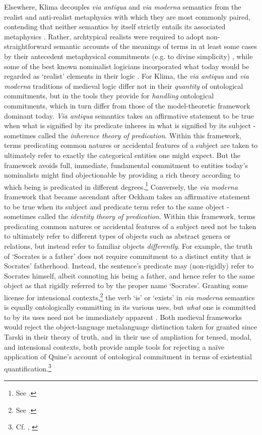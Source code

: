 \documentclass[]{article}
\begin{document}
Elsewhere, Klima decouples \emph{via antiqua} and \emph{via moderna} semantics 
from the realist and anti-realist metaphysics with which they are most commonly paired,
contending that neither semantics by itself strictly entails its associated metaphysics \autocite{Klima1999,Klima2011}. 
Rather, archtypical realists were required to adopt non-straightforward semantic accounts of the meanings of terms in at least some cases by their antecedent metaphysical commitments (e.g. to divine simplicity) \autocite{Klima2002b},
while some of the best known nominalist logicians incorporated what today would be regarded as `realist' elements in their logic \autocite{Klima2005}. 
For Klima, the \emph{via antiqua} and \emph{via moderna} traditions of medieval logic 
differ not in their \emph{quantity} of ontological commitments, 
but in the tools they provide for \emph{handling} ontological commitments, 
which in turn differ from those of the model-theoretic framework dominant today. 
\emph{Via antiqua} semantics takes an affirmative statement to be true when what is signified by its predicate inheres in what is signified by its subject - 
sometimes called the \emph{inherence theory of predication}. 
Within this framework, 
terms predicating common natures or accidental features of a subject are taken to ultimately refer to exactly the categorical entities one might expect. 
But the framework 
avoids full, immediate, fundamental commitment to entities today's nominalists might find objectionable by providing a rich theory according to which being is predicated in different degrees.\footnote{See \autocite{Klima2002}.}
Conversely, the \emph{via moderna} framework that became ascendant after Ockham 
takes an affirmative statement to be true when its subject and predicate term refer to the same object 
 - sometimes called the \emph{identity theory of predication}. 
Within this framework, 
terms predicating common natures or accidental features of a subject need not be taken to ultimately refer to different types of objects such as abstract genera or relations, 
but instead refer to familiar objects \emph{differently}. 
For example, the truth of `Socrates is a father' does not require commitment to a distinct entity that is Socrates' fatherhood.
Instead, the sentence's predicate may (non-rigidly) refer to Socrates himself, 
albeit connoting his being a father, 
and hence refer to the same object as that rigidly referred to by the proper name `Socrates'. 
Granting some license for intensional contexts,\footnote{See \autocite{Klima2005}.} 
the verb `is' or `exists' in \emph{via moderna} semantics is equally ontologically committing in its various uses, 
but \emph{what} one is committed to by its uses need not be immediately apparent  \autocite[437-430]{Klima2008a}. 
Both medieval frameworks would reject the object-language metalanguage distinction taken for granted since Tarski in their theory of truth, 
and 
in their use of ampliation for tensed, modal, and intensional contexts,
both provide ample tools for rejecting a na\"{i}ve application of Quine's account of ontological commitment in terms of existential quantification.\footnote{Cf. \autocite{Klima2004}, 
\autocite[171-174]{Klima2009}}
\end{document}
